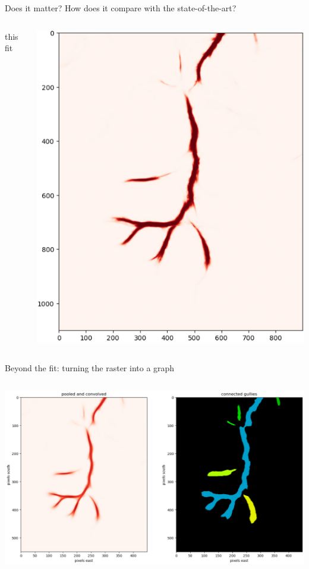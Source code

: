 \documentclass[aspectratio=169]{beamer}
\begin{document}
\begin{frame}{Does it matter? How does it compare with the state-of-the-art?}
\begin{columns}
\centering this fit

\vspace{0.1 cm}
\includegraphics[width=\linewidth]{img/compare-fit-pass2.png}
\end{columns}
\end{frame}

\begin{frame}{Beyond the fit: turning the raster into a graph}
\vspace{0.25 cm}
\begin{columns}
\includegraphics[width=\linewidth]{img/pooling-and-connected-components.png}
\end{columns}
\end{frame}
\end{document}
